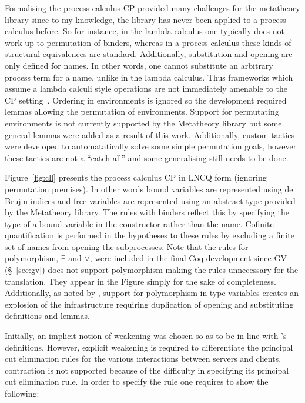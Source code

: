Formalising the process calculus CP provided many challenges for the
metatheory library since to my knowledge, the library has never been applied
to a process calculus before. So for instance, in the lambda calculus one
typically does not work up to permutation of binders, whereas in a process
calculus these kinds of structural equivalences are standard. Additionally,
substitution and opening are only defined for names. In other words, one
cannot substitute an arbitrary process term for a name, unlike in the lambda
calculus. Thus frameworks which assume a lambda calculi style operations are
not immediately amenable to the CP setting~\cite{Lee:2012}. Ordering in
environments is ignored so the development required lemmas allowing the
permutation of environments. Support for permutating environments is not
currently supported by the Metatheory library but some general lemmas were
added as a result of this work. Additionally, custom tactics were developed to
automatatically solve some simple permutation goals, however these tactics are
not a ``catch all'' and some generalising still needs to be done.


Figure~\ref{fig:cll} presents the process calculus CP in LNCQ form (ignoring
permutation premises). In other words bound variables are represented using de
Brujin indices and free variables are represented using an abstract type
provided by the Metatheory library. The rules with binders reflect this by
specifying the type of a bound variable in the constructor rather than the
name. Cofinite quantification is performed in the hypotheses to these rules by
excluding a finite set of names from opening the subprocesses. Note that the
rules for polymorphism, $\exists$ and $\forall$, were included in the final
Coq development since GV (\S~\ref{sec:gv}) does not support polymorphism
making the rules unnecessary for the translation. They appear in the Figure
simply for the sake of completeness. Additionally, as noted by
\citeauthor{Lee:2012}, support for polymorphism in type variables creates an
explosion of the infrastructure requiring duplication of opening and
substituting definitions and lemmas.


Initially, an implicit notion of weakening was chosen so as to be in line with
\citeauthor{Wadler:2014}'s definitions. However, explicit weakening is
required to differentiate the principal cut elimination rules for the various
interactions between servers and clients. contraction is not supported because
of the difficulty in specifying its principal cut elimination rule. In order
to specify the rule one requires to show the following:

